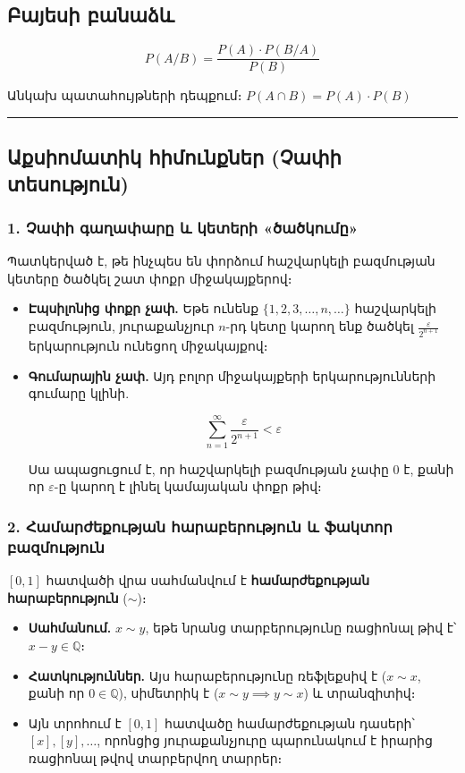 \documentclass[12pt, a4paper]{article}
\begin{document}
\subsection{Բայեսի բանաձև}
$$P(A / B) = \frac{P(A) \cdot P(B / A)}{P(B)}$$

Անկախ պատահույթների դեպքում։ $P(A \cap B) = P(A) \cdot P(B)$

\vspace{1em}
\hrule
\vspace{1em}

\subsection{Աքսիոմատիկ հիմունքներ (Չափի տեսություն)}

\subsubsection{1. Չափի գաղափարը և կետերի «ծածկումը»}

Պատկերված է, թե ինչպես են փորձում հաշվարկելի բազմության կետերը ծածկել շատ փոքր միջակայքերով։

\begin{itemize}
    \item \textbf{Էպսիլոնից փոքր չափ.} Եթե ունենք $\{1, 2, 3, \dots, n, \dots\}$ հաշվարկելի բազմություն, յուրաքանչյուր $n$-րդ կետը կարող ենք ծածկել $\frac{\varepsilon}{2^{n+1}}$ երկարություն ունեցող միջակայքով։
    \item \textbf{Գումարային չափ.} Այդ բոլոր միջակայքերի երկարությունների գումարը կլինի.
    
    $$\sum_{n=1}^{\infty} \frac{\varepsilon}{2^{n+1}} < \varepsilon$$
    
    Սա ապացուցում է, որ հաշվարկելի բազմության չափը $0$ է, քանի որ $\varepsilon$-ը կարող է լինել կամայական փոքր թիվ։
\end{itemize}

\subsubsection{2. Համարժեքության հարաբերություն և ֆակտոր բազմություն}

$[0, 1]$ հատվածի վրա սահմանվում է \textbf{համարժեքության հարաբերություն} ($\sim$)։

\begin{itemize}
    \item \textbf{Սահմանում.} $x \sim y$, եթե նրանց տարբերությունը ռացիոնալ թիվ է՝ $x - y \in \mathbb{Q}$։
    \item \textbf{Հատկություններ.} Այս հարաբերությունը ռեֆլեքսիվ է ($x \sim x$, քանի որ $0 \in \mathbb{Q}$), սիմետրիկ է ($x \sim y \implies y \sim x$) և տրանզիտիվ։
    \item Այն տրոհում է $[0, 1]$ հատվածը համարժեքության դասերի՝ $[x], [y], \dots$, որոնցից յուրաքանչյուրը պարունակում է իրարից ռացիոնալ թվով տարբերվող տարրեր։
\end{itemize}
\end{document}
